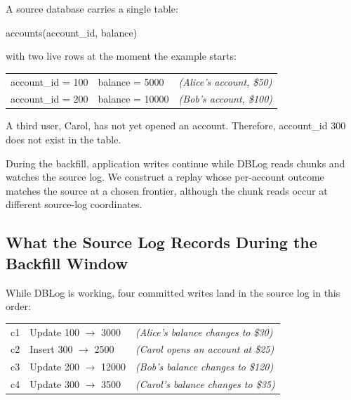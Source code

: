 \documentclass[letterpaper,10pt,twocolumn]{article}
\begin{document}
A source database carries a single table:

\begin{center}\ttfamily\small
accounts(account\_id, balance)
\end{center}

with two live rows at the moment the example starts:

\begin{center}\footnotesize
\begin{tabular}{@{}l@{\hskip 1em}l@{\hskip 1em}l@{}}
\ttfamily account\_id = 100 & \ttfamily balance = \phantom{0}5000 & \itshape (Alice's account, \$50)\\
\ttfamily account\_id = 200 & \ttfamily balance = 10000           & \itshape (Bob's account, \$100)\\
\end{tabular}
\end{center}

A third user, Carol, has not yet opened an account. Therefore,
account\_id 300 does not exist in the table.

During the backfill, application writes continue while DBLog reads
chunks and watches the source log. We construct a replay whose
per-account outcome matches the source at a chosen frontier, although
the chunk reads occur at different source-log coordinates.

\subsection{What the Source Log Records During the Backfill
Window}\label{what-the-source-log-records-during-the-backfill-window}

While DBLog is working, four committed writes land in the source log in
this order:

\begin{center}\footnotesize
\begin{tabular}{@{}l@{\hskip 1em}l@{\hskip 1em}l@{}}
\ttfamily c1 & \ttfamily Update 100 $\to$ \phantom{0}3000 & \itshape (Alice's balance changes to \$30)\\
\ttfamily c2 & \ttfamily Insert 300 $\to$ \phantom{0}2500  & \itshape (Carol opens an account at \$25)\\
\ttfamily c3 & \ttfamily Update 200 $\to$ 12000           & \itshape (Bob's balance changes to \$120)\\
\ttfamily c4 & \ttfamily Update 300 $\to$ \phantom{0}3500 & \itshape (Carol's balance changes to \$35)\\
\end{tabular}
\end{center}
\end{document}
